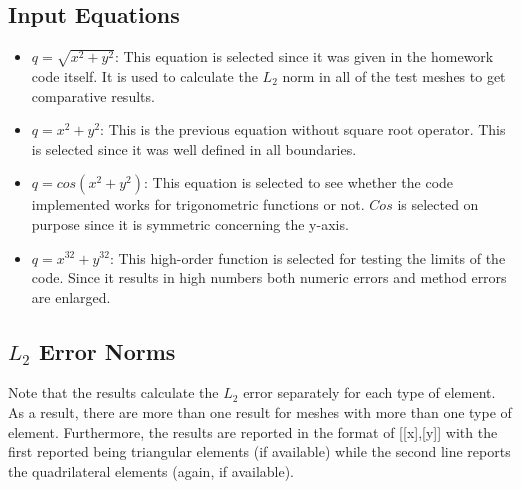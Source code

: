 \documentclass[a4paper, 12pt]{article}
\begin{document}
\subsection{Input Equations}
\begin{itemize}
    \item $q = \sqrt{x^{2}+y^{2}}$: This equation is selected since it was given in the homework code itself. It is used to calculate the $L_2$ norm in all of the test meshes to get comparative results. 
    \item $q = {x^{2}+y^{2}}$: This is the previous equation without square root operator. This is selected since it was well defined in all boundaries.
    \item $q = cos{(x^{2}+y^{2})}$: This equation is selected to see whether the code implemented works for trigonometric functions or not. $Cos$ is selected on purpose since it is symmetric concerning the y-axis.
    \item $q = {x^{32}+y^{32}}$: This high-order function is selected for testing the limits of the code. Since it results in high numbers both numeric errors and method errors are enlarged.  
\end{itemize}
\subsection{$L_2$ Error Norms}
Note that the results calculate the $L_2$ error separately for each type of element. As a result, there are more than one result for meshes with more than one type of element. Furthermore, the results are reported in the format of [[x],[y]] with the first reported being triangular elements (if available) while the second line reports the quadrilateral elements (again, if available). 
\end{document}
